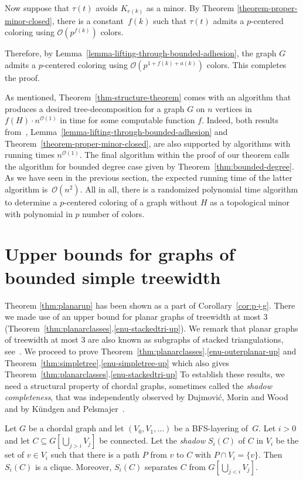 Now suppose that $\tau(t)$ avoids $K_{e(k)}$ as a minor.  By Theorem
\ref{theorem-proper-minor-closed}, there is a constant~$f(k)$ such that
$\tau(t)$ admits a $p$-centered coloring using $\mathcal{O}(p^{f(k)})$ colors.

Therefore, by Lemma~\ref{lemma-lifting-through-bounded-adhesion}, the graph $G$ 
admits a $p$-centered coloring using $\mathcal{O}(p^{1+f(k)+a(k)})$ colors.
This completes the proof.

As mentioned, Theorem~\ref{thm-structure-theorem} comes with an algorithm 
that produces a desired tree-decomposition for a graph $G$ on $n$ vertices in
$f(H)\cdot n^{\mathcal{O}(1)}$ in time for some computable function $f$. Indeed, both results
from~\cite{PS19},  Lemma~\ref{lemma-lifting-through-bounded-adhesion} and
Theorem~\ref{theorem-proper-minor-closed}, are also supported by algorithms
with  running times $n^{\mathcal{O}(1)}$. The final algorithm within the proof of our theorem
calls the algorithm for bounded degree case given by 
Theorem~\ref{thm:bounded-degree}.
As we have seen in the previous section, the expected running
time of the latter algorithm is~$\mathcal{O}(n^2)$. All in all, there is a randomized polynomial time
algorithm to determine a $p$-centered coloring of a graph without  $H$ as a topological
minor with polynomial in $p$ number of colors.

\section{Upper bounds for graphs of bounded simple treewidth}
\label{sec-upper-bounds-subplanars}

Theorem \ref{thm:planarup} has been shown as a part of
Corollary~\ref{cor:p+g}.  There we made use of an upper bound for planar
graphs of treewidth at most 3
(Theorem~\ref{thm:planarclasses}.\ref{enu-stackedtri-up}).  We remark that
planar graphs of treewidth at most 3 are also known as subgraphs of stacked
triangulations, see~\cite{KV12}. We proceed to prove
Theorem~\ref{thm:planarclasses}.\ref{enu-outerplanar-up} and
Theorem~\ref{thm:simpletree}.\ref{enu-simpletree-up} which also gives
Theorem~\ref{thm:planarclasses}.\ref{enu-stackedtri-up} To establish these
results, we need a structural property of chordal graphs, sometimes called the
\emph{shadow completeness}, that was independently observed by Dujmovi\'c,
Morin and Wood~\cite{DMM05} and by Kündgen and Pelsmajer~\cite{KP08}.
  
\begin{lemma}\label{lemma-shadow}
  Let $G$ be a chordal graph and let $(V_0,V_1,\ldots)$ be a BFS-layering
  of~$G$. Let $i>0$ and let $C\subseteq G[\bigcup_{j> i} V_j]$ be
  connected. Let the \emph{shadow} $S_i(C)$ of $C$ in $V_i$ be the set of
  $v\in V_i$ such that there is a path $P$ from $v$ to $C$ with
  $P\cap V_i = \{v\}$. Then $S_i(C)$ is a clique. Moreover, $S_i(C)$ separates
  $C$ from $G[\bigcup_{j< i} V_j]$.
\end{lemma}

